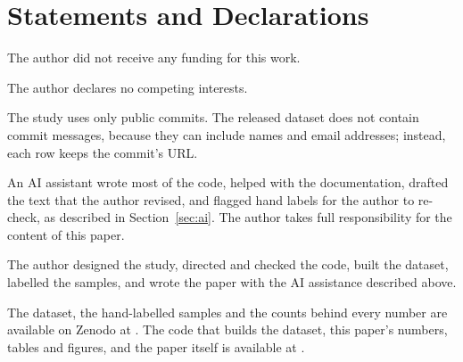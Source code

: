 \section*{Statements and Declarations}

 The author did not receive any funding for this work.

 The author declares no competing interests.

 The study uses only public commits. The released dataset does not contain commit messages, because they can include names and email addresses; instead, each row keeps the commit's URL.

 An AI assistant wrote most of the code, helped with the documentation, drafted the text that the author revised, and flagged hand labels for the author to re-check, as described in Section~\ref{sec:ai}. The author takes full responsibility for the content of this paper.

 The author designed the study, directed and checked the code, built the dataset, labelled the samples, and wrote the paper with the AI assistance described above.

 The dataset, the hand-labelled samples and the counts behind every number are available on Zenodo \citep{hassan2026dataset} at \DataDOI. The code that builds the dataset, this paper's numbers, tables and figures, and the paper itself is available at \RepoURL.

